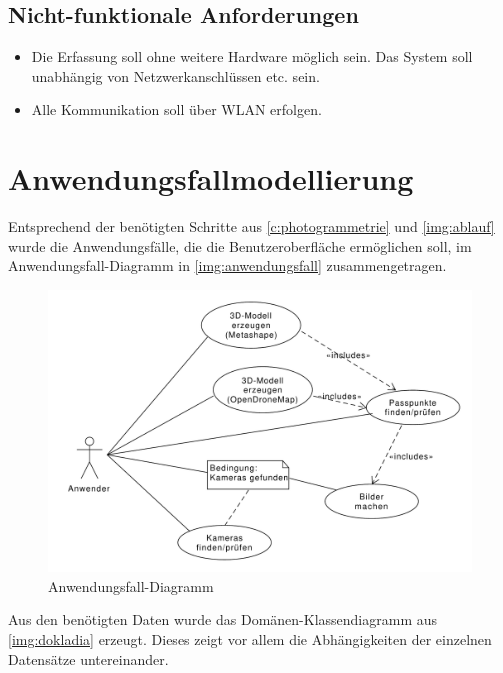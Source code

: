 \documentclass[./00PhotoBox.tex]{subfiles}
\begin{document}
\subsection{Nicht-funktionale Anforderungen}
\begin{itemize}
    \item Die Erfassung soll ohne weitere Hardware möglich sein. Das System soll unabhängig von Netzwerkanschlüssen etc. sein.
    \item Alle Kommunikation soll über WLAN erfolgen.
\end{itemize}

\section{Anwendungsfallmodellierung}
\label{sec:Anwendungsfallmodellierung}

Entsprechend der benötigten Schritte aus \autoref{c:photogrammetrie} und \autoref{img:ablauf} wurde die Anwendungsfälle, die die Benutzeroberfläche ermöglichen soll, im Anwendungsfall-Dia\-gramm in \autoref{img:anwendungsfall} zusammengetragen.

\begin{figure}
    \centering
    \includegraphics[width=1\textwidth]{./img/uml/uml_usecases.pdf}
    \caption{Anwendungsfall-Diagramm} %
    \label{img:anwendungsfall} %
\end{figure}

Aus den benötigten Daten wurde das Domänen-Klassendiagramm aus \autoref{img:dokladia} erzeugt. Dieses zeigt vor allem die Abhängigkeiten der einzelnen Datensätze untereinander.
\end{document}
